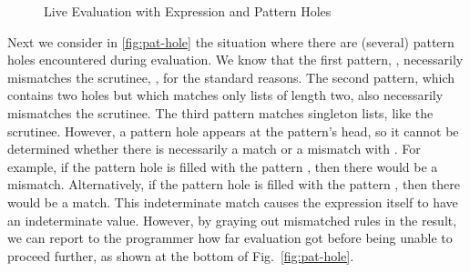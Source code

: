 \begin{figure}
\hfil
{}
  \caption{Live Evaluation with Expression and Pattern Holes}
  \label{fig:evaluation-ex}
\end{figure}


Next we consider in \autoref{fig:pat-hole} the situation where there are (several) pattern holes encountered during evaluation. 
We know that the first pattern, \li{[]}, necessarily mismatches the scrutinee, , for the standard reasons.
The second pattern, which contains two holes but which matches only lists of length two, also necessarily mismatches the scrutinee.
The third pattern matches singleton lists, like the scrutinee. However, a pattern hole appears at the pattern's head, so it cannot be determined 
whether there is necessarily a match or a mismatch with . For example, if the pattern hole is filled with the pattern , 
then there would be a mismatch. Alternatively, if the pattern hole is filled with the pattern , then there would be a match. This indeterminate match causes the  expression itself to have an indeterminate value.
However, by graying out mismatched rules in the result, we can report to the programmer how far evaluation got before being unable to proceed further, as shown at the bottom of Fig.~\ref{fig:pat-hole}.